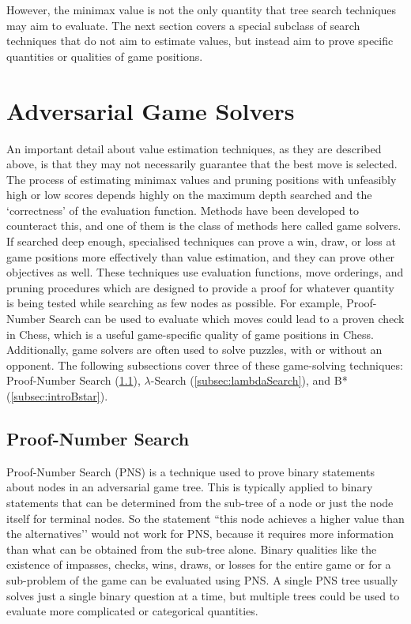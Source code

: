 However, the minimax value is not the only quantity that tree search techniques may aim to evaluate. The next section covers a special subclass of search techniques that do not aim to estimate values, but instead aim to prove specific quantities or qualities of game positions. 


\section{Adversarial Game Solvers}
\label{sec:introGameSolvers}
An important detail about value estimation techniques, as they are described above, is that they may not necessarily guarantee that the best move is selected. The process of estimating minimax values and pruning positions with unfeasibly high or low scores depends highly on the maximum depth searched and the `correctness’ of the evaluation function. Methods have been developed to counteract this, and one of them is the class of methods here called game solvers. If searched deep enough, specialised techniques can prove a win, draw, or loss at game positions more effectively than value estimation, and they can prove other objectives as well. These techniques use evaluation functions, move orderings, and pruning procedures which are designed to provide a proof for whatever quantity is being tested while searching as few nodes as possible. For example, Proof-Number Search can be used to evaluate which moves could lead to a proven check in Chess, which is a useful game-specific quality of game positions in Chess. Additionally, game solvers are often used to solve puzzles, with or without an opponent. The following subsections cover three of these game-solving techniques: Proof-Number Search (\ref{subsec:introPNS}), $\lambda$-Search (\ref{subsec:lambdaSearch}), and B* (\ref{subsec:introBstar}).

\subsection{Proof-Number Search}
\label{subsec:introPNS}
Proof-Number Search (PNS) \cite{Allis1994} is a technique used to prove binary statements about nodes in an adversarial game tree. This is typically applied to binary statements that can be determined from the sub-tree of a node or just the node itself for terminal nodes. So the statement ``this node achieves a higher value than the alternatives’’ would not work for PNS, because it requires more information than what can be obtained from the sub-tree alone. Binary qualities like the existence of impasses, checks, wins, draws, or losses for the entire game or for a sub-problem of the game can be evaluated using PNS. A single PNS tree usually solves just a single binary question at a time, but multiple trees could be used to evaluate more complicated or categorical quantities.

